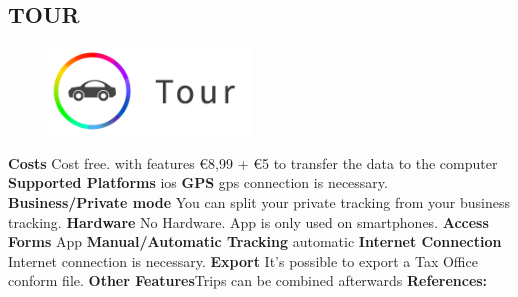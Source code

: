 \begin{singlespace}
\section{TOUR}
\begin{figure}
  \begin{center}
    \includegraphics[width=0.48\textwidth]{bilder/tour}
  \end{center}
\end{figure}
\textbf{Costs} Cost free. with features \euro 8,99 + \euro 5 to transfer the data to the computer
\newline\newline
\textbf{Supported Platforms} \gls{ios}
\newline\newline
\textbf{GPS} \gls{gps} connection is necessary.
\newline\newline
\textbf{Business/Private mode} You can split your private tracking from your business tracking.
\newline\newline
\textbf{Hardware} No Hardware. App is only used on smartphones.
\newline\newline
\textbf{Access Forms} App
\newline\newline
\textbf{Manual/Automatic Tracking} automatic
\newline\newline
\textbf{Internet Connection} Internet connection is necessary.
\newline\newline
\textbf{Export} It’s possible to export a Tax Office conform file.
\newline\newline
\textbf{Other Features}Trips can be combined afterwards
\newline\newline
\textbf{References:} \cite{TOUR}
\newpage
\clearpageauthor

\end{singlespace}
